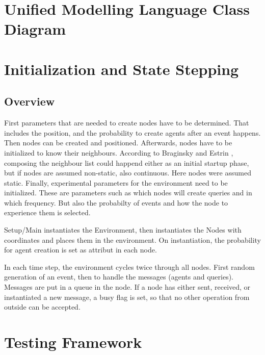 \documentclass[a4paper,11pt,twoside]{article}
\begin{document}
\section{Unified Modelling Language Class Diagram}



\section{Initialization and State Stepping}
\subsection{Overview}
First parameters that are needed to create nodes have to be determined.
That includes the position, and the probability to create agents after
an event happens. Then nodes can be created and
positioned. Afterwards, nodes have to be initialized to know their
neighbours. According to Braginsky and Estrin \cite{braginsky2002},
composing the neighbour list could happend either as an initial
startup phase, but if nodes are assumed non-static, also
continuous. Here nodes were assumed static. Finally, experimental
parameters for the environment need to be initialized. These are
parameters such as which nodes will create queries and in which
frequency. But also the probabilty of events and how the node to
experience them is selected. 

Setup/Main instantiates the Environment, then instantiates the Nodes
with coordinates and places them in the environment. On
instantiation, the probability for agent creation is set as attribut
in each node.

In each time step, the environment cycles twice through all
nodes. First random generation of an event, then to handle the messages
(agents and queries). Messages are put in a queue in the node. If
a node has either sent, received, or instantiated a new message, a
busy flag is set, so that no other operation from outside
can be accepted.   








\section{Testing Framework}



\end{document}
